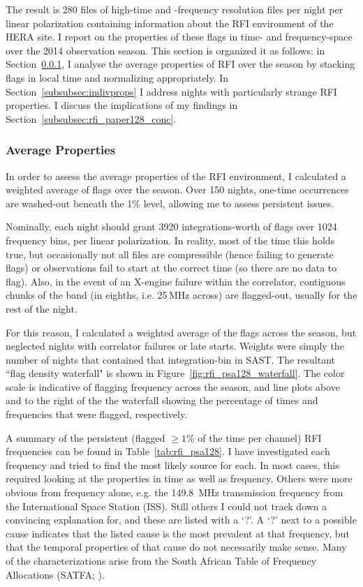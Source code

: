 The result is 280 files of high-time and -frequency resolution files per night per linear polarization containing information about the RFI environment of the HERA site. I report on the properties of these flags in time- and frequency-space over the 2014 observation season. This section is organized it as follows: in Section~\ref{subsubsec:avgprops}, I analyse the average properties of RFI over the season by stacking flags in local time and normalizing appropriately. In Section~\ref{subsubsec:indivprops} I address nights with particularly strange RFI properties. I discuss the implications of my findings in Section~\ref{subsubsec:rfi_paper128_conc}.

\subsubsection{Average Properties}
\label{subsubsec:avgprops}

In order to assess the average properties of the RFI environment, I calculated a weighted average of flags over the season. Over 150 nights, one-time occurrences are washed-out beneath the 1\% level, allowing me to assess persistent issues.

Nominally, each night should grant 3920 integrations-worth of flags over 1024 frequency bins, per linear polarization. In reality, most of the time this holds true, but occasionally not all files are compressible (hence failing to generate flags) or observations fail to start at the correct time (so there are no data to flag). Also, in the event of an X-engine failure within the correlator, contiguous chunks of the band (in eighths, i.e. 25\,MHz across) are flagged-out, usually for the rest of the night.

For this reason, I calculated a weighted average of the flags across the season, but neglected nights with correlator failures or late starts. Weights were simply the number of nights that contained that integration-bin in SAST. The resultant ``flag density waterfall" is shown in Figure~\ref{fig:rfi_psa128_waterfall}. The color scale is indicative of flagging frequency across the season, and line plots above and to the right of the the waterfall showing the percentage of times and frequencies that were flagged, respectively. 

A summary of the persistent (flagged $\geq1\%$ of the time per channel) RFI frequencies can be found in Table~\ref{tab:rfi_psa128}. I have investigated each frequency and tried to find the most likely source for each. In most cases, this required looking at the properties in time as well as frequency. Others were more obvious from frequency alone, e.g. the 149.8\, MHz transmission frequency from the International Space Station (ISS). Still others I could not track down a convincing explanation for, and these are listed with a `?'. A `?' next to a possible cause indicates that the listed cause is the most prevalent at that frequency, but that the temporal properties of that cause do not necessarily make sense. Many of the characterizations arise from the South African Table of Frequency Allocations (SATFA; \cite{SAFreqTable}).

